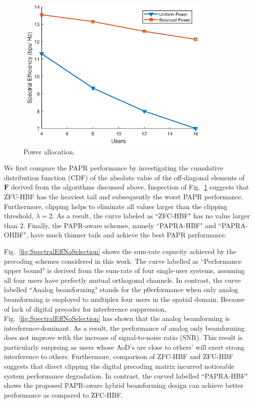\documentclass[conference]{IEEEtran}
\begin{document}
\begin{figure}[ht]
	\begin{center}
		\includegraphics[width=3.8in,height=3in]{Figure/powerBalanced.eps}
		\caption{Power allocation.}\label{fig:CDF}
	\end{center}
\end{figure}

We first compare the PAPR performance by investigating the cumulative distribution function (CDF) of the absolute value of the off-diagonal elements of ${\bm F}$ derived from the algorithms discussed above. Inspection of Fig.~\ref{fig:CDF} suggests that ZFU-HBF has the heaviest tail and subsequently the worst PAPR performance. Furthermore, clipping helps to eliminate all values larger than the clipping threshold, {\em $\lambda=2$}. As a result, the curve labeled as ``ZFC-HBF" has no value larger than $2$. Finally, the PAPR-aware schemes, namely ``PAPRA-HBF" and ``PAPRA-OHBF", have much thinner tails and achieve the best PAPR performance.


Fig.~\ref{fig:SpectralEffNoSelection} shows the sum-rate capacity achieved by the precoding schemes considered in this work. The curve labelled as ``Performance upper bound" is derived from the sum-rate of four single-user systems, assuming all four users have perfectly mutual orthogonal channels. In contrast, the curve labelled ``Analog beamforming" stands for the p0erformance when only analog beamforming is employed to multiplex four users in the spatial domain. Because of lack of digital precoder for interference suppression, Fig.~\ref{fig:SpectralEffNoSelection} has shown that the analog beamforming is interference-dominant. As a result, the performance of analog only beamforming does not improve with the increase of signal-to-noise ratio (SNR). This result is particularly surprsing as users whose AoD's are close to others' will exert strong interference to others. Furthermore, comparison of ZFC-HBF and ZFU-HBF suggests that direct clipping the digital precoding matrix incurred noticeable system performance degradation. In contrast, the curved labelled ``PAPRA-HBF" shows the proposed PAPR-aware hybrid beamforming design can achieve better performance as compared to ZFC-HBF.
\end{document}
